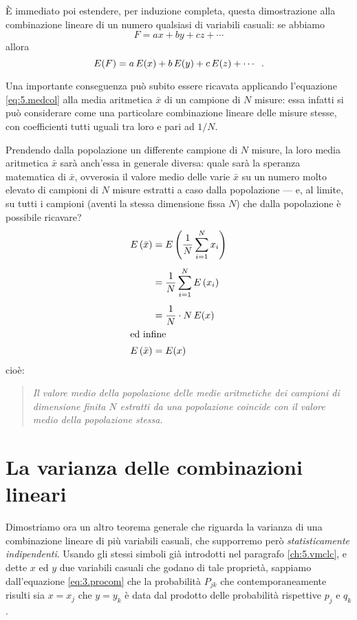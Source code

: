 \`E immediato poi estendere, per induzione completa, questa
dimostrazione alla combinazione lineare di un numero
qualsiasi di variabili casuali: se abbiamo
\begin{equation*}
  F = a x + b y + c z +\cdots
\end{equation*}
allora
\begin{equation} \label{eq:5.medcol}
  E(F) = a \, E(x) + b \, E(y) + c \, E(z) + \cdots \;\; .
\end{equation}%
%

%
Una importante conseguenza pu\`o subito essere ricavata
applicando l'equazione \eqref{eq:5.medcol} alla media
aritmetica $\bar x$ di un campione di $N$ misure: essa
infatti si pu\`o considerare come una particolare
combinazione lineare delle misure stesse, con coefficienti
tutti uguali tra loro e pari ad $1/N$.

Prendendo dalla popolazione un differente campione di $N$
misure, la loro media aritmetica $\bar x$ sar\`a anch'essa
in generale diversa: quale sar\`a la speranza matematica di
$\bar x$, ovverosia il valore medio delle varie $\bar x$ su
un numero molto elevato di campioni di $N$ misure estratti a
caso dalla popolazione --- e, al limite, su tutti i campioni
(aventi la stessa dimensione fissa $N$) che dalla
popolazione \`e possibile ricavare?
\begin{align}
  E \left( \bar x \right) &= E \left( \frac{1}{N}
    \sum_{i=1}^N x_i \right) \notag \\[1ex]
  &= \frac{1}{N} \sum_{i=1}^N E \left( x_i \right)
    \notag \\[1ex]
  &= \frac{1}{N} \cdot N \, E(x) \notag \\
\intertext{ed infine}
  E \left( \bar x \right) &= E(x) \label{eq:5.ebarx}
\end{align}
cio\`e:
\begin{quote}
  \textit{Il valore medio della popolazione delle medie
    aritmetiche dei campioni di dimensione finita $N$
    estratti da una popolazione coincide con il valore medio
    della popolazione stessa}.
\end{quote}%

\section{La varianza delle combinazioni lineari}%
%
Dimostriamo ora un altro teorema generale che riguarda la
varianza di una combinazione lineare di pi\`u variabili
casuali, che supporremo per\`o \emph{statisticamente
  indipendenti}.  Usando gli stessi simboli gi\`a introdotti
nel paragrafo \ref{ch:5.vmclc}, e dette $x$ ed $y$ due
variabili casuali che godano di tale propriet\`a, sappiamo
dall'equazione \eqref{eq:3.procom} che la probabilit\`a
$P_{jk}$ che contemporaneamente risulti sia $x = x_j$ che $y
= y_k$ \`e data dal prodotto delle probabilit\`a rispettive
$p_j$ e $q_k$.

